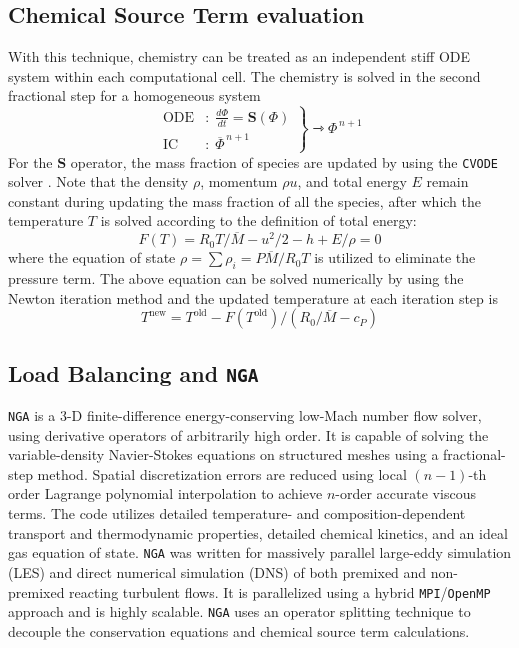 \documentclass[letterpaper,twocolumn,10pt]{article}
\begin{document}
\subsection{Chemical Source Term evaluation}
With this technique, chemistry can be treated as an independent stiff ODE system within each computational cell. The chemistry is solved in the second fractional step for a homogeneous system
\begin{equation*}
    \left.
    \begin{aligned}
        \textrm{ODE}&: \; \frac{d \Phi}{d t} = \textbf{S} (\Phi) \\
        \textrm{IC}&: \; \overline{\Phi}^{\, n+1}
    \end{aligned}
    \right\} \rightarrowtriangle \Phi^{\, n+1}
\end{equation*}
For the $\textbf{S}$ operator, the mass fraction of species are updated by using the \texttt{CVODE} solver \cite{SUNDIALS}. Note that the density $\rho$, momentum $\rho u$, and total energy $E$ remain constant during updating the mass fraction of all the species, after which the temperature $T$ is solved according to the definition of total energy:
$$F(T) = R_0 T / \overline{M} - u^2 / 2 - h + E / \rho = 0$$
where the equation of state $\rho = \sum \rho_i = P \overline{M} / R_0 T$ is utilized to eliminate the pressure term. The above equation can be solved numerically by using the Newton iteration method and the
updated temperature at each iteration step is
$$T^\textrm{new} = T^\textrm{old} - F(T^\textrm{old})/(R_0 / \overline{M} - c_P)$$

\subsection{Load Balancing and \texttt{NGA}}
\texttt{NGA} \cite{DESJARDINS2008,MACART2016} is a 3-D finite-difference energy-conserving low-Mach number flow solver, using derivative operators of arbitrarily high order. It is capable of solving the variable-density Navier-Stokes equations on structured meshes using a fractional-step method. Spatial discretization errors are reduced using local $(n-1)$-th order Lagrange polynomial interpolation to achieve $n$-order accurate viscous terms. The code utilizes detailed temperature- and composition-dependent transport and thermodynamic properties, detailed chemical kinetics, and an ideal gas equation of state. \texttt{NGA} was written for massively parallel large-eddy simulation (LES) and direct numerical simulation (DNS) of both premixed and non-premixed reacting turbulent flows. It is parallelized using a hybrid \texttt{MPI}/\texttt{OpenMP} approach and is highly scalable. \texttt{NGA} uses an operator splitting technique to decouple the conservation equations and chemical source term calculations.
\end{document}
